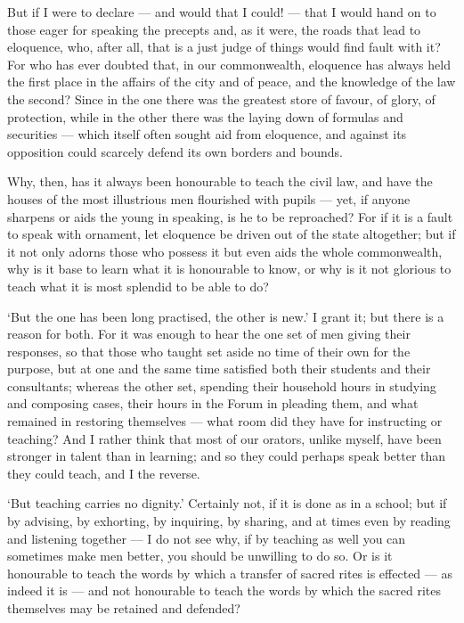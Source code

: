  But if I were to declare — and would that I could! — that I would hand on to those eager for speaking the precepts and, as it were, the roads that lead to eloquence, who, after all, that is a just judge of things would find fault with it? For who has ever doubted that, in our commonwealth, eloquence has always held the first place in the affairs of the city and of peace, and the knowledge of the law the second? Since in the one there was the greatest store of favour, of glory, of protection, while in the other there was the laying down of formulas and securities — which itself often sought aid from eloquence, and against its opposition could scarcely defend its own borders and bounds.

 Why, then, has it always been honourable to teach the civil law, and have the houses of the most illustrious men flourished with pupils — yet, if anyone sharpens or aids the young in speaking, is he to be reproached? For if it is a fault to speak with ornament, let eloquence be driven out of the state altogether; but if it not only adorns those who possess it but even aids the whole commonwealth, why is it base to learn what it is honourable to know, or why is it not glorious to teach what it is most splendid to be able to do?

 `But the one has been long practised, the other is new.' I grant it; but there is a reason for both. For it was enough to hear the one set of men giving their responses, so that those who taught set aside no time of their own for the purpose, but at one and the same time satisfied both their students and their consultants; whereas the other set, spending their household hours in studying and composing cases, their hours in the Forum in pleading them, and what remained in restoring themselves — what room did they have for instructing or teaching? And I rather think that most of our orators, unlike myself, have been stronger in talent than in learning; and so they could perhaps speak better than they could teach, and I the reverse.

 `But teaching carries no dignity.' Certainly not, if it is done as in a school; but if by advising, by exhorting, by inquiring, by sharing, and at times even by reading and listening together — I do not see why, if by teaching as well you can sometimes make men better, you should be unwilling to do so. Or is it honourable to teach the words by which a transfer of sacred rites is effected — as indeed it is — and not honourable to teach the words by which the sacred rites themselves may be retained and defended?


